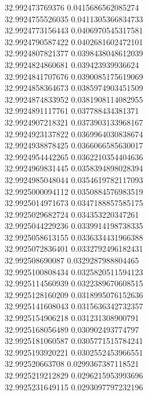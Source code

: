 {32.992473769376	0.0415686562085274\\
32.9924755526035	0.0411305366834733\\
32.9924773156443	0.0406970545317581\\
32.9924790587422	0.0402681602472101\\
32.9924807821377	0.0398438048612039\\
32.9924824860681	0.039423939936624\\
32.9924841707676	0.0390085175619069\\
32.9924858364673	0.0385974903451509\\
32.9924874833952	0.0381908114082955\\
32.9924891117761	0.037788434381371\\
32.9924907218321	0.0373903133968167\\
32.9924923137822	0.0369964030838674\\
32.9924938878425	0.0366066585630017\\
32.9924954442265	0.0362210354404636\\
32.9924969831445	0.0358394898028394\\
32.9924985048044	0.0354619782117093\\
32.9925000094112	0.0350884576983519\\
32.9925014971673	0.0347188857585175\\
32.9925029682724	0.034353220347261\\
32.9925044229236	0.0339914198738335\\
32.9925058613155	0.0336334431966388\\
32.9925072836401	0.0332792496182431\\
32.992508690087	0.0329287988804465\\
32.9925100808434	0.0325820511594123\\
32.9925114560939	0.0322389670608515\\
32.9925128160209	0.0318995076152636\\
32.9925141608043	0.0315636342732357\\
32.9925154906218	0.031231308900791\\
32.9925168056489	0.030902493774797\\
32.9925181060587	0.0305771515784241\\
32.9925193920221	0.0302552453966551\\
32.992520663708	0.0299367387118521\\
32.9925219212829	0.0296215953993696\\
32.9925231649115	0.0293097797232196\\
}
